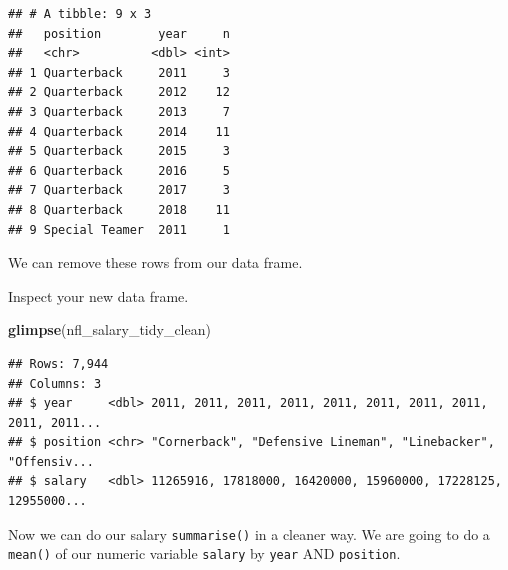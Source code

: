 \documentclass[
]{book}
\newenvironment{Shaded}{\begin{snugshade}}{\end{snugshade}}
\newcommand{\DataTypeTok}[1]{\textcolor[rgb]{0.13,0.29,0.53}{#1}}
\newcommand{\KeywordTok}[1]{\textcolor[rgb]{0.13,0.29,0.53}{\textbf{#1}}}
\newcommand{\NormalTok}[1]{#1}
\newcommand{\OperatorTok}[1]{\textcolor[rgb]{0.81,0.36,0.00}{\textbf{#1}}}
\newcommand{\StringTok}[1]{\textcolor[rgb]{0.31,0.60,0.02}{#1}}
\begin{document}
\begin{verbatim}
## # A tibble: 9 x 3
##   position        year     n
##   <chr>          <dbl> <int>
## 1 Quarterback     2011     3
## 2 Quarterback     2012    12
## 3 Quarterback     2013     7
## 4 Quarterback     2014    11
## 5 Quarterback     2015     3
## 6 Quarterback     2016     5
## 7 Quarterback     2017     3
## 8 Quarterback     2018    11
## 9 Special Teamer  2011     1
\end{verbatim}

We can remove these rows from our data frame.

\begin{Shaded}
\end{Shaded}

Inspect your new data frame.

\begin{Shaded}
\begin{Highlighting}[]
\KeywordTok{glimpse}\NormalTok{(nfl_salary_tidy_clean)}
\end{Highlighting}
\end{Shaded}

\begin{verbatim}
## Rows: 7,944
## Columns: 3
## $ year     <dbl> 2011, 2011, 2011, 2011, 2011, 2011, 2011, 2011, 2011, 2011...
## $ position <chr> "Cornerback", "Defensive Lineman", "Linebacker", "Offensiv...
## $ salary   <dbl> 11265916, 17818000, 16420000, 15960000, 17228125, 12955000...
\end{verbatim}

Now we can do our salary \texttt{summarise()} in a cleaner way. We are going to do a \texttt{mean()} of our numeric variable \texttt{salary} by \texttt{year} AND \texttt{position}.

\begin{Shaded}
\end{Shaded}
\end{document}
